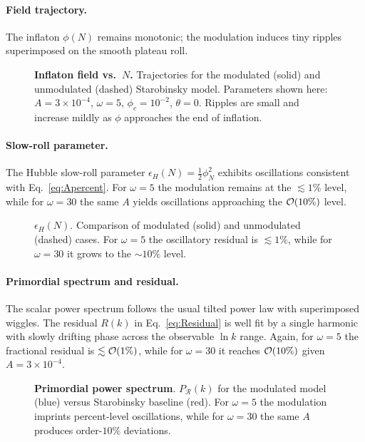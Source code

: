 \documentclass[12pt]{article}
\begin{document}
\paragraph{Field trajectory.} 
The inflaton $\phi(N)$ remains monotonic; the modulation induces tiny ripples superimposed on the smooth plateau roll.

\begin{figure}[t]
\centering
\caption{\textbf{Inflaton field vs.\ $N$.} Trajectories for the modulated (solid) and unmodulated (dashed) Starobinsky model. Parameters shown here: $A=3\times10^{-4}$, $\omega=5$, $\phi_c=10^{-2}$, $\theta=0$. Ripples are small and increase mildly as $\phi$ approaches the end of inflation.}
\label{fig:phiN}
\end{figure}

\paragraph{Slow-roll parameter.}
The Hubble slow-roll parameter $\epsilon_H(N)=\tfrac12\phi_N^2$ exhibits oscillations consistent with Eq.~\eqref{eq:Apercent}. 
For $\omega=5$ the modulation remains at the $\lesssim 1\%$ level, while for $\omega=30$ the same $A$ yields oscillations approaching the ${\cal O}(10\%)$ level.

\begin{figure}[t]
\centering
\caption{\textbf{$\epsilon_H(N)$}. Comparison of modulated (solid) and unmodulated (dashed) cases. For $\omega=5$ the oscillatory residual is $\lesssim1\%$, while for $\omega=30$ it grows to the $\sim 10\%$ level.}
\label{fig:epsN}
\end{figure}

\paragraph{Primordial spectrum and residual.}
The scalar power spectrum follows the usual tilted power law with superimposed wiggles. The residual $R(k)$ in Eq.~\eqref{eq:Residual} is well fit by a single harmonic with slowly drifting phase across the observable $\ln k$ range. 
Again, for $\omega=5$ the fractional residual is $\lesssim{\cal O}(1\%)$, while for $\omega=30$ it reaches ${\cal O}(10\%)$ given $A=3\times10^{-4}$.

\begin{figure}[t]
\centering
\caption{\textbf{Primordial power spectrum}. $P_{\mathcal R}(k)$ for the modulated model (blue) versus Starobinsky baseline (red). For $\omega=5$ the modulation imprints percent-level oscillations, while for $\omega=30$ the same $A$ produces order-$10\%$ deviations.}
\label{fig:PR}
\end{figure}
\end{document}
